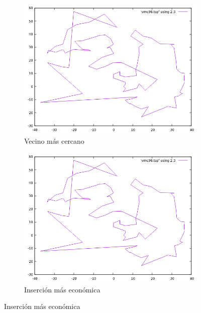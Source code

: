 \documentclass[12pt,spanish]{article}
\begin{document}
\begin{figure}[H]
\centering
\begin{subfigure}[b]{0.36\textwidth}
\includegraphics[width=\textwidth]{gr96_vmc.png}
\caption{Vecino más cercano}
\end{subfigure}
\quad
\begin{subfigure}[b]{0.36\textwidth}
\includegraphics[width=\textwidth]{gr96_vmc.png}
\caption{Inserción más económica}
\end{subfigure}

\vspace{1cm}


\end{figure}
\end{document}
